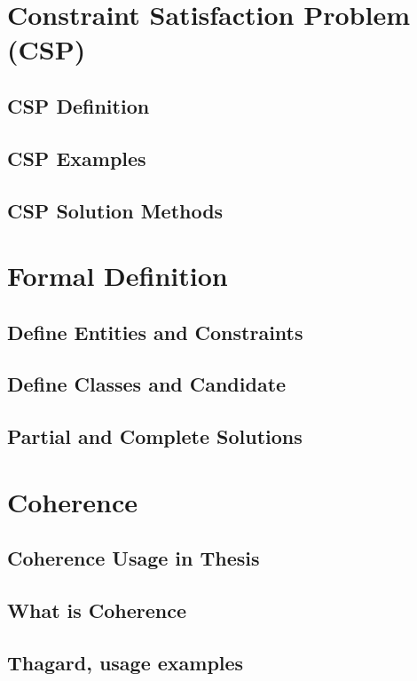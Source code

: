 \documentclass{beamer}
\begin{document}
\section{Constraint Satisfaction Problem (CSP)}
\subsection{CSP Definition}
\subsection{CSP Examples}
\subsection{CSP Solution Methods}

\section{Formal Definition}
\subsection{Define Entities and Constraints}
\subsection{Define Classes and Candidate}
\subsection{Partial and Complete Solutions}

\section{Coherence}
\subsection{Coherence Usage in Thesis}
\subsection{What is Coherence}
\subsection{Thagard, usage examples}
\end{document}
